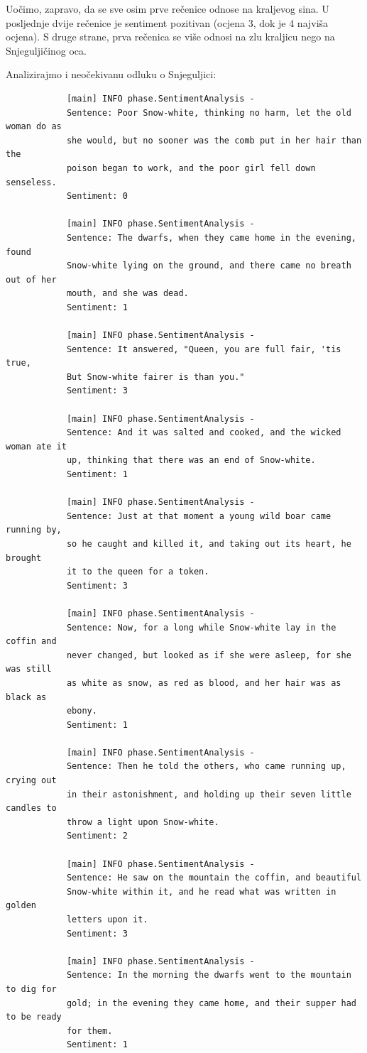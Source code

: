 \documentclass[a4paper,twoside,12pt]{memoir} %
\begin{document}
		Uočimo, zapravo, da se sve osim prve rečenice odnose na kraljevog sina. U posljednje dvije rečenice je sentiment pozitivan (ocjena 3, dok je 4 najviša ocjena).  S druge strane, prva rečenica se više odnosi na zlu kraljicu nego na Snjeguljičinog oca.

		Analizirajmo i neočekivanu odluku o Snjeguljici:

		\begin{verbatim}
			[main] INFO phase.SentimentAnalysis -
			Sentence: Poor Snow-white, thinking no harm, let the old woman do as
			she would, but no sooner was the comb put in her hair than the
			poison began to work, and the poor girl fell down senseless.
			Sentiment: 0

			[main] INFO phase.SentimentAnalysis -
			Sentence: The dwarfs, when they came home in the evening, found
			Snow-white lying on the ground, and there came no breath out of her
			mouth, and she was dead.
			Sentiment: 1

			[main] INFO phase.SentimentAnalysis -
			Sentence: It answered, "Queen, you are full fair, 'tis true,
			But Snow-white fairer is than you."
			Sentiment: 3

			[main] INFO phase.SentimentAnalysis -
			Sentence: And it was salted and cooked, and the wicked woman ate it
			up, thinking that there was an end of Snow-white.
			Sentiment: 1

			[main] INFO phase.SentimentAnalysis -
			Sentence: Just at that moment a young wild boar came running by,
			so he caught and killed it, and taking out its heart, he brought
			it to the queen for a token.
			Sentiment: 3

			[main] INFO phase.SentimentAnalysis -
			Sentence: Now, for a long while Snow-white lay in the coffin and
			never changed, but looked as if she were asleep, for she was still
			as white as snow, as red as blood, and her hair was as black as
			ebony.
			Sentiment: 1

			[main] INFO phase.SentimentAnalysis -
			Sentence: Then he told the others, who came running up, crying out
			in their astonishment, and holding up their seven little candles to
			throw a light upon Snow-white.
			Sentiment: 2

			[main] INFO phase.SentimentAnalysis -
			Sentence: He saw on the mountain the coffin, and beautiful
			Snow-white within it, and he read what was written in golden
			letters upon it.
			Sentiment: 3

			[main] INFO phase.SentimentAnalysis -
			Sentence: In the morning the dwarfs went to the mountain to dig for
			gold; in the evening they came home, and their supper had to be ready
			for them.
			Sentiment: 1


\end{verbatim}
\end{document}
